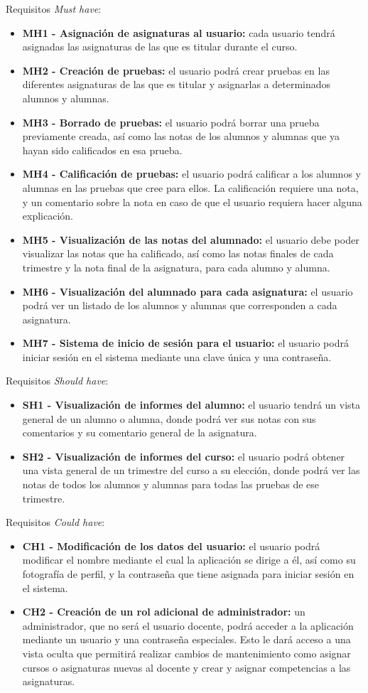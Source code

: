 Requisitos \textit{Must have}:
\begin{itemize}
	\item \textbf{MH1 - Asignación de asignaturas al usuario:} cada usuario tendrá asignadas las asignaturas de las que es titular durante el curso. 
	\item \textbf{MH2 - Creación de pruebas:} el usuario podrá crear pruebas en las diferentes asignaturas de las que es titular y asignarlas a determinados alumnos y alumnas.
	\item \textbf{MH3 - Borrado de pruebas:} el usuario podrá borrar una prueba previamente creada, así como las notas de los alumnos y alumnas que ya hayan sido calificados en esa prueba.
	\item \textbf{MH4 - Calificación de pruebas:} el usuario podrá calificar a los alumnos y alumnas en las pruebas que cree para ellos. La calificación requiere una nota, y un comentario sobre la nota en caso de que el usuario requiera hacer alguna explicación.
	\item \textbf{MH5 - Visualización de las notas del alumnado:} el usuario debe poder visualizar las notas que ha calificado, así como las notas finales de cada trimestre y la nota final de la asignatura, para cada alumno y alumna.
	\item \textbf{MH6 - Visualización del alumnado para cada asignatura:} el usuario podrá ver un listado de los alumnos y alumnas que corresponden a cada asignatura.
	\item \textbf{MH7 - Sistema de inicio de sesión para el usuario:} el usuario podrá iniciar sesión en el sistema mediante una clave única y una contraseña.
\end{itemize}
	
Requisitos \textit{Should have}:
\begin{itemize}
	\item \textbf{SH1 - Visualización de informes del alumno:} el usuario tendrá un vista general de un alumno o alumna, donde podrá ver sus notas con sus comentarios y su comentario general de la asignatura.
	\item \textbf{SH2 - Visualización de informes del curso:} el usuario podrá obtener una vista general de un trimestre del curso a su elección, donde podrá ver las notas de todos los alumnos y alumnas para todas las pruebas de ese trimestre.
\end{itemize}

Requisitos \textit{Could have}:
\begin{itemize}
	\item \textbf{CH1 - Modificación de los datos del usuario:} el usuario podrá modificar el nombre mediante el cual la aplicación se dirige a él, así como su fotografía de perfil, y la contraseña que tiene asignada para iniciar sesión en el sistema.
	\item \textbf{CH2 - Creación de un rol adicional de administrador:} un administrador, que no será el usuario docente, podrá acceder a la aplicación mediante un usuario y una contraseña especiales. Esto le dará acceso a una vista oculta que permitirá realizar cambios de mantenimiento como asignar cursos o asignaturas nuevas al docente y crear y asignar competencias a las asignaturas.
\end{itemize}

